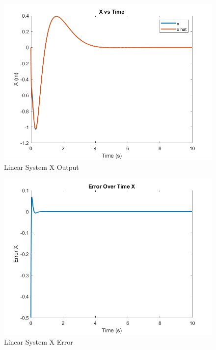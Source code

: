 \begin{figure}[!ht]
    \centering
    \includegraphics[width=\linewidth]{figs/of_lin_x.png}
    \caption{Linear System X Output}
    \label{}
\end{figure}

\begin{figure}[!ht]
    \centering
    \includegraphics[width=\linewidth]{figs/of_lin_x_err.png}
    \caption{Linear System X Error}
    \label{}
\end{figure}

